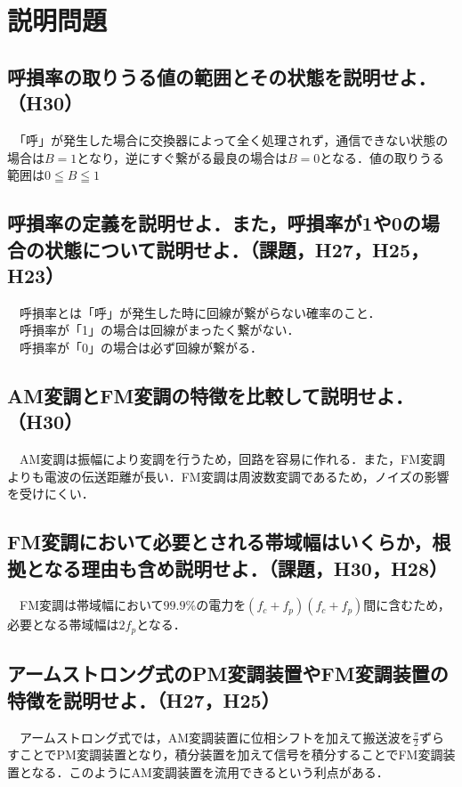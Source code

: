 

\pagestyle{fancy}
\section{説明問題}
\subsection{呼損率の取りうる値の範囲とその状態を説明せよ．（H30）}
　「呼」が発生した場合に交換器によって全く処理されず，通信できない状態の場合は$B=1$となり，逆にすぐ繋がる最良の場合は$B=0$となる．値の取りうる範囲は$0\leqq B \leqq1$\\

\subsection{呼損率の定義を説明せよ．また，呼損率が1や0の場合の状態について説明せよ．（課題，H27，H25，H23）}
　呼損率とは「呼」が発生した時に回線が繋がらない確率のこと．\\
　呼損率が「1」の場合は回線がまったく繋がない．\\
　呼損率が「0」の場合は必ず回線が繋がる．\\

\subsection{AM変調とFM変調の特徴を比較して説明せよ．（H30）}
　AM変調は振幅により変調を行うため，回路を容易に作れる．また，FM変調よりも電波の伝送距離が長い．FM変調は周波数変調であるため，ノイズの影響を受けにくい．

\subsection{FM変調において必要とされる帯域幅はいくらか，根拠となる理由も含め説明せよ．（課題，H30，H28）}
　FM変調は帯域幅において$99.9\%$の電力を$\left( f_c + f_p \right) \left( f_c + f_p \right)$間に含むため，必要となる帯域幅は$2 f_p$となる．\\

\subsection{アームストロング式のPM変調装置やFM変調装置の特徴を説明せよ．（H27，H25）}
　アームストロング式では，AM変調装置に位相シフトを加えて搬送波を$\frac{\pi}{2}$ずらすことでPM変調装置となり，積分装置を加えて信号を積分することでFM変調装置となる．このようにAM変調装置を流用できるという利点がある．\\

